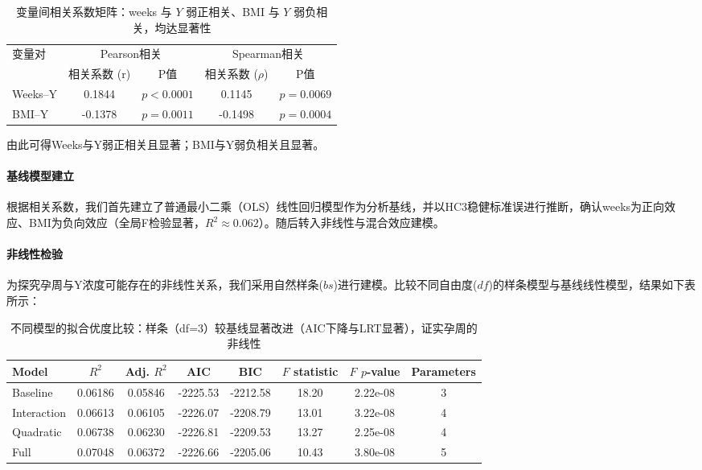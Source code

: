 \documentclass[withoutpreface]{cumcmthesis}
\begin{document}
\begin{table}[htbp]
  \centering
  \caption{变量间相关系数矩阵：weeks 与 $Y$ 弱正相关、BMI 与 $Y$ 弱负相关，均达显著性}
  \label{tab:correlation}
  \begin{tabular}{lcccc}
    \toprule
    \multirow{2}{*}{变量对} & \multicolumn{2}{c}{Pearson相关} & \multicolumn{2}{c}{Spearman相关} \\
    \cmidrule(lr){2-3} \cmidrule(lr){4-5}
    & 相关系数 (r) & P值 & 相关系数 ($\rho$) & P值 \\
    \midrule
    Weeks–Y & 0.1844 & $p < 0.0001$ & 0.1145 & $p = 0.0069$ \\
    BMI–Y  & -0.1378 & $p = 0.0011$ & -0.1498 & $p = 0.0004$ \\
    \bottomrule
  \end{tabular}
\end{table}

由此可得Weeks与Y弱正相关且显著；BMI与Y弱负相关且显著。

\paragraph{基线模型建立}
根据相关系数，我们首先建立了普通最小二乘（OLS）线性回归模型作为分析基线，并以HC3稳健标准误进行推断，确认weeks为正向效应、BMI为负向效应（全局F检验显著，$R^2\approx0.062$）。随后转入非线性与混合效应建模。

\paragraph{非线性检验}
为探究孕周与Y浓度可能存在的非线性关系，我们采用自然样条($bs$)进行建模。比较不同自由度($df$)的样条模型与基线线性模型，结果如下表所示：

\begin{table}[htbp]
    \centering
    \setlength{\tabcolsep}{4pt}
    \caption{不同模型的拟合优度比较：样条（df=3）较基线显著改进（AIC下降与LRT显著），证实孕周的非线性}
    \label{tab:model_comparison}
    \begin{tabular}{l
				S[table-format=1.5]
				S[table-format=1.5]
				S[table-format=-4.4]
				S[table-format=-4.4]
				S[table-format=2.5]
				S[table-format=1.2e-2]
				c}
\toprule
        Model & {$R^2$} & {Adj. $R^2$} & {AIC} & {BIC} & {$F$ statistic} & {$F$ $p$-value} & {Parameters} \\
        \midrule
        Baseline    & 0.06186 & 0.05846 & -2225.53 & -2212.58 & 18.20 & 2.22e-08 & 3 \\
        Interaction & 0.06613 & 0.06105 & -2226.07 & -2208.79 & 13.01 & 3.22e-08 & 4 \\
        Quadratic   & 0.06738 & 0.06230 & -2226.81 & -2209.53 & 13.27 & 2.25e-08 & 4 \\
        Full        & 0.07048 & 0.06372 & -2226.66 & -2205.06 & 10.43 & 3.80e-08 & 5 \\
        \bottomrule
    \end{tabular}
\end{table}
\end{document}
